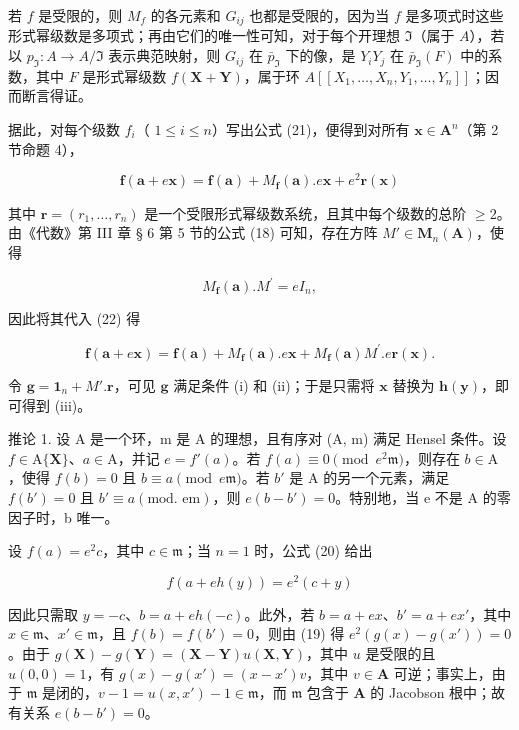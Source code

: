 若 \(f\) 是受限的，则 \(M_{f}\) 的各元素和 \(G_{ij}\) 也都是受限的，因为当 \(f\) 是多项式时这些形式幂级数是多项式；再由它们的唯一性可知，对于每个开理想 \(\Im\)（属于 \(A\)），若以 \(p_{\Im} \colon A \to A / \Im\) 表示典范映射，则 \(G_{ij}\) 在 \(\bar{p}_{\Im}\) 下的像，是 \(Y_{i}Y_{j}\) 在 \(\bar{p}_{\Im}(F)\) 中的系数，其中 \(F\) 是形式幂级数 \(f(\mathbf{X} + \mathbf{Y})\)，属于环 \(A[[X_1, \ldots, X_n, Y_1, \ldots, Y_n]]\)；因而断言得证。

据此，对每个级数 \(f_{i}\)（ \(1 \leqslant i \leqslant n\)）写出公式 (21)，便得到对所有 \(\mathbf{x} \in \mathbf{A}^n\)（第 2 节命题 4），

\[
\mathbf {f} (\mathbf {a} + e \mathbf {x}) = \mathbf {f} (\mathbf {a}) + M _ {\mathbf {f}} (\mathbf {a}). e \mathbf {x} + e ^ {2} \mathbf {r} (\mathbf {x})\tag{22}
\]

其中 \(\mathbf{r} = (r_1, \ldots, r_n)\) 是一个受限形式幂级数系统，且其中每个级数的总阶 \(\geqslant 2\)。由《代数》第 III 章 § 6 第 5 节的公式 (18) 可知，存在方阵 \(M' \in \mathbf{M}_n(\mathbf{A})\)，使得

\[
M _ {\mathbf {f}} (\mathbf {a}). M ^ {\prime} = e I _ {n},\tag{23}
\]

因此将其代入 (22) 得

\[
\mathbf {f} (\mathbf {a} + e \mathbf {x}) = \mathbf {f} (\mathbf {a}) + M _ {\mathbf {f}} (\mathbf {a}). e \mathbf {x} + M _ {\mathbf {f}} (\mathbf {a}) M ^ {\prime}. e \mathbf {r} (\mathbf {x}).\tag{24}
\]

令 \(\mathbf{g} = \mathbf{1}_n + M'.\mathbf{r}\)，可见 \(\mathbf{g}\) 满足条件 (i) 和 (ii)；于是只需将 \(\mathbf{x}\) 替换为 \(\mathbf{h}(\mathbf{y})\)，即可得到 (iii)。

推论 1. 设 A 是一个环，m 是 A 的理想，且有序对 (A, m) 满足 Hensel 条件。设 \(f \in \mathrm{A}\{\mathbf{X}\}\)、\(a \in \mathrm{A}\)，并记 \(e = f'(a)\)。若 \(f(a) \equiv 0 \pmod{e^2\mathfrak{m}}\)，则存在 \(b \in \mathrm{A}\)，使得 \(f(b) = 0\) 且 \(b \equiv a \pmod{e\mathfrak{m}}\)。若 \(b'\) 是 A 的另一个元素，满足 \(f(b') = 0\) 且 \(b' \equiv a (\text{mod. em})\)，则 \(e(b - b') = 0\)。特别地，当 e 不是 A 的零因子时，b 唯一。

设 \(f(a) = e^{2}c\)，其中 \(c \in \mathfrak{m}\)；当 \(n = 1\) 时，公式 (20) 给出

\[
f (a + e h (y)) = e ^ {2} (c + y)
\]

因此只需取 \(y = -c\)、\(b = a + eh(-c)\)。此外，若 \(b = a + ex\)、\(b' = a + ex'\)，其中 \(x \in \mathfrak{m}\)、\(x' \in \mathfrak{m}\)，且 \(f(b) = f(b') = 0\)，则由 (19) 得 \(e^2(g(x) - g(x')) = 0\)。由于 \(g(\mathbf{X}) - g(\mathbf{Y}) = (\mathbf{X} - \mathbf{Y})u(\mathbf{X}, \mathbf{Y})\)，其中 \(u\) 是受限的且 \(u(0,0) = 1\)，有 \(g(x) - g(x') = (x - x')v\)，其中 \(v \in \mathbf{A}\) 可逆；事实上，由于 \(\mathfrak{m}\) 是闭的，\(v - 1 = u(x,x') - 1 \in \mathfrak{m}\)，而 \(\mathfrak{m}\) 包含于 \(\mathbf{A}\) 的 Jacobson 根中；故有关系 \(e(b - b') = 0\)。

